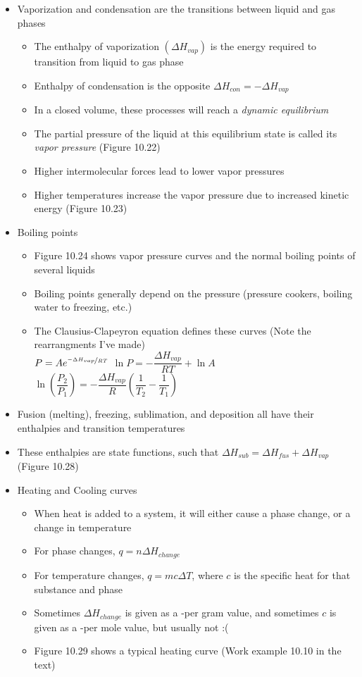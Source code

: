 \documentclass[12pt, openany, letterpaper]{memoir}
\begin{document}
\begin{itemize}
  \item Vaporization and condensation are the transitions between liquid and gas phases
  \begin{itemize}
    \item The enthalpy of vaporization $\left(\Delta H_{vap}\right)$ is the energy required to transition from liquid to gas phase
    \item Enthalpy of condensation is the opposite $\Delta H_{con} = - \Delta H_{vap}$
    \item In a closed volume, these processes will reach a \emph{dynamic equilibrium}
    \item The partial pressure of the liquid at this equilibrium state is called its \emph{vapor pressure} (Figure 10.22)
    \item Higher intermolecular forces lead to lower vapor pressures
    \item Higher temperatures increase the vapor pressure due to increased kinetic energy (Figure 10.23)
  \end{itemize}
  \item Boiling points
  \begin{itemize}
    \item Figure 10.24 shows vapor pressure curves and the normal boiling points of several liquids
    \item Boiling points generally depend on the pressure (pressure cookers, boiling water to freezing, etc.)
    \item The Clausius-Clapeyron equation defines these curves (Note the rearrangments I've made)
      \\ $P=Ae^{\nicefrac{-\Delta H_{vap}}{RT}}$ \hspace{2em} 
      $\ln P = -\dfrac{\Delta H_{vap}}{RT}+\ln A$ \hspace{2em}
      $\ln\left(\dfrac{P_2}{P_1}\right)=-\dfrac{\Delta H_{vap}}{R}\left(\dfrac{1}{T_2}-\dfrac{1}{T_1}\right)$ 
  \end{itemize}
  \item Fusion (melting), freezing, sublimation, and deposition all have their enthalpies and transition temperatures
  \item These enthalpies are state functions, such that $\Delta H_{sub} = \Delta H_{fus}+\Delta H_{vap}$ (Figure 10.28)
  \item Heating and Cooling curves
  \begin{itemize}
    \item When heat is added to a system, it will either cause a phase change, or a change in temperature
    \item For phase changes, $q=n\Delta H_{change}$
    \item For temperature changes, $q=mc\Delta T$, where $c$ is the specific heat for that substance and phase
    \item Sometimes $\Delta H_{change}$ is given as a -per gram value, and sometimes $c$ is given as a -per mole value, but usually not :(
    \item Figure 10.29 shows a typical heating curve (Work example 10.10 in the text)
  \end{itemize}
\end{itemize}
\end{document}
